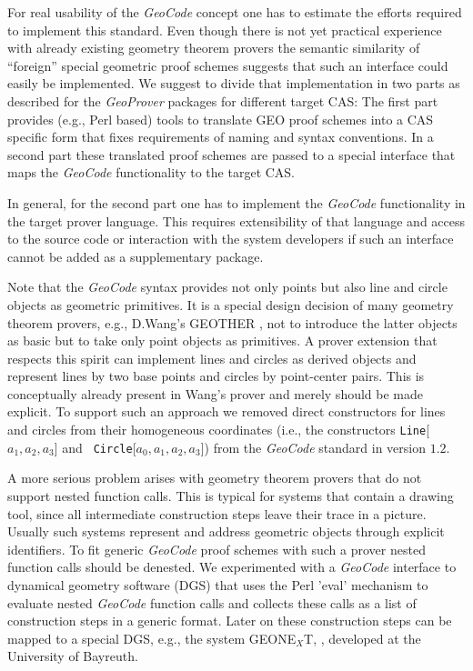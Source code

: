 \documentclass[11pt]{article}
\newcommand{\GC}{\textit{Geo\-Code}}
\newcommand{\GP}{\textit{Geo\-Prover}}
\begin{document}
For real usability of the {\GC} concept one has to estimate the efforts
required to implement this standard.  Even though there is not yet practical
experience with already existing geometry theorem provers the semantic
similarity of ``foreign'' special geometric proof schemes suggests that such
an interface could easily be implemented.  We suggest to divide that
implementation in two parts as described for the {\GP} packages for different
target CAS: The first part provides (e.g., Perl based) tools to translate GEO
proof schemes into a CAS specific form that fixes requirements of naming and
syntax conventions.  In a second part these translated proof schemes are
passed to a special interface that maps the {\GC} functionality to the target
CAS.

In general, for the second part one has to implement the {\GC} functionality
in the target prover language. This requires extensibility of that language
and access to the source code or interaction with the system developers if
such an interface cannot be added as a supplementary package.

Note that the {\GC} syntax provides not only points but also line and circle
objects as geometric primitives.  It is a special design decision of many
geometry theorem provers, e.g., D.Wang's GEOTHER \cite{Geother}, not to
introduce the latter objects as basic but to take only point objects as
primitives.  A prover extension that respects this spirit can implement lines
and circles as derived objects and represent lines by two base points and
circles by point-center pairs. This is conceptually already present in Wang's
prover and merely should be made explicit. To support such an approach we
removed direct constructors for lines and circles from their homogeneous
coordinates (i.e., the constructors {\tt Line}[$a_1,a_2,a_3$] and {\tt
  Circle}[$a_0,a_1,a_2,a_3$]) from the {\GC} standard in version $1.2$.

A more serious problem arises with geometry theorem provers that do not
support nested function calls. This is typical for systems that contain a
drawing tool, since all intermediate construction steps leave their trace in a
picture. Usually such systems represent and address geometric objects through
explicit identifiers.  To fit generic {\GC} proof schemes with such a prover
nested function calls should be denested. We experimented with a {\GC}
interface to dynamical geometry software (DGS) that uses the Perl 'eval'
mechanism to evaluate nested {\GC} function calls and collects these calls as
a list of construction steps in a generic format. Later on these construction
steps can be mapped to a special DGS, e.g., the system {GEONE$_X$T},
\cite{Geonext}, developed at the University of Bayreuth. 
\end{document}
